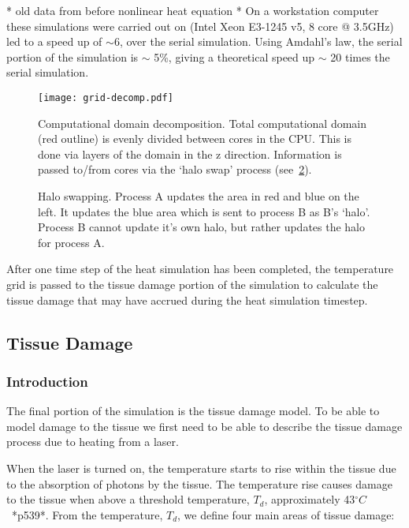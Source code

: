 * old data from before nonlinear heat equation *
On a workstation computer these simulations were carried out on (Intel Xeon E3-1245 v5, 8 core @ 3.5GHz) led to a speed up of $\sim$6, over the serial simulation. Using Amdahl's law\cite{amdahl1967validity}, the serial portion of the simulation is $\sim$ 5\%, giving a theoretical speed up $\sim$ 20 times the serial simulation.


\begin{figure}
\vspace{-45pt}
\centering
\texttt{[image: grid-decomp.pdf]}
\caption{Computational domain decomposition. Total computational domain (red outline) is evenly divided between cores in the CPU. This is done via layers of the domain in the z direction. Information is passed to/from cores via the `halo swap' process (see~\cref{fig:haloswap}).}
\label{fig:griddecomp}
\vspace{-10pt}
\end{figure}

\begin{figure}
\centering
\def\svgwidth{350pt}

\caption{Halo swapping. Process A updates the area in red and blue on the left. It updates the blue area which is sent to process B as B's `halo'. Process B cannot update it's own halo, but rather updates the halo for process A.}
\label{fig:haloswap}
\end{figure}


After one time step of the heat simulation has been completed, the temperature grid is passed to the tissue damage portion of the simulation to calculate the tissue damage that may have accrued during the heat simulation timestep.

\subsection{Tissue Damage}
\label{sec:tissuedamage}

\subsubsection{Introduction}
The final portion of the simulation is the tissue damage model. To be able to model damage to the tissue we first need to be able to describe the tissue damage process due to heating from a laser.

When the laser is turned on, the temperature starts to rise within the tissue due to the absorption of photons by the tissue. The temperature rise causes damage to the tissue when above a threshold temperature, $T_d$, approximately 43$^{\circ}C$~\cite{welch2011optical}*p539*. From the temperature, $T_d$, we define four main areas of tissue damage:


